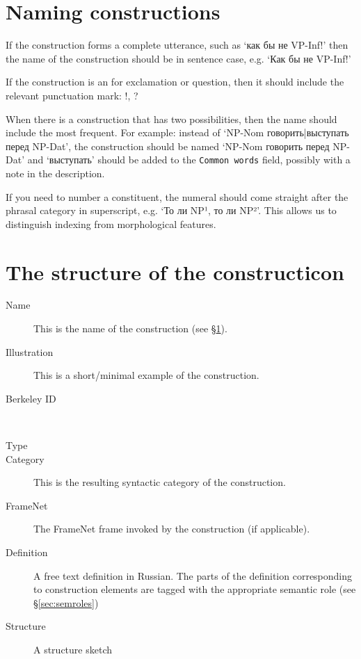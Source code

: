 \documentclass[a4paper,11pt, onecolumn,twoside]{article}
\begin{document}
\section{Naming constructions}
\label{sec:name}


If the construction forms a complete utterance, such as `как бы не VP-Inf!' then the 
name of the construction should be in sentence case, e.g. `Как бы не VP-Inf!'

If the construction is an for exclamation or question, then it should include the 
relevant punctuation mark: !, ?

When there is a construction that has two possibilities, then the name should 
include the most frequent. For example: instead of `NP-Nom говорить|выступать перед NP-Dat',
the construction should be named `NP-Nom говорить перед NP-Dat' and `выступать' should
be added to the \texttt{Common words} field, possibly with a note in the description.

If you need to number a constituent, the numeral should come straight after the phrasal
category in superscript, e.g. `То ли NP¹, то ли NP²'. This allows us to distinguish indexing
from morphological features.

\section{The structure of the constructicon}

\begin{description}
  \item[Name] This is the name of the construction (see §\ref{sec:name}).
  \item[Illustration] This is a short/minimal example of the construction.
  \item[Berkeley ID] ~
  \item[Type]
  \item[Category] This is the resulting syntactic category of the construction.
  \item[FrameNet] The FrameNet frame invoked by the construction (if applicable).
  \item[Definition] A free text definition in Russian. The parts of the definition 
      corresponding to construction elements are tagged with the appropriate semantic role (see §\ref{sec:semroles})
  \item[Structure] A structure sketch
\end{description}



% 
\end{document}
